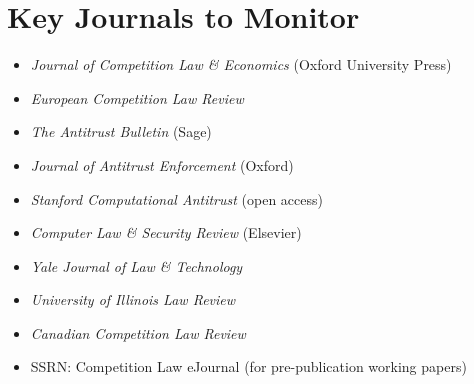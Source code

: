 \documentclass[12pt, letterpaper]{article}
\begin{document}
\section*{Key Journals to Monitor}

\begin{itemize}[itemsep=2pt]
\item \textit{Journal of Competition Law \& Economics} (Oxford University Press)
\item \textit{European Competition Law Review}
\item \textit{The Antitrust Bulletin} (Sage)
\item \textit{Journal of Antitrust Enforcement} (Oxford)
\item \textit{Stanford Computational Antitrust} (open access)
\item \textit{Computer Law \& Security Review} (Elsevier)
\item \textit{Yale Journal of Law \& Technology}
\item \textit{University of Illinois Law Review}
\item \textit{Canadian Competition Law Review}
\item SSRN: Competition Law eJournal (for pre-publication working papers)
\end{itemize}
\end{document}
